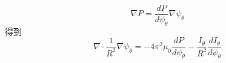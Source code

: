 \documentclass[11pt,a4paper]{article}
\begin{document}
	$$
	\nabla{P}=\frac{dP}{d\psi_\theta}\nabla{\psi_\theta}
	$$
	得到
	$$
	\nabla\cdot\frac{1}{R^2}\nabla\psi_\theta=-4\pi^2\mu_0\frac{dP}{d\psi_\theta}-\frac{I_\theta}{R^2}\frac{dI_\theta}{d\psi_\theta}
	$$
	
	
	
	
	
	
	
	
	
	
	
	
\end{document}
